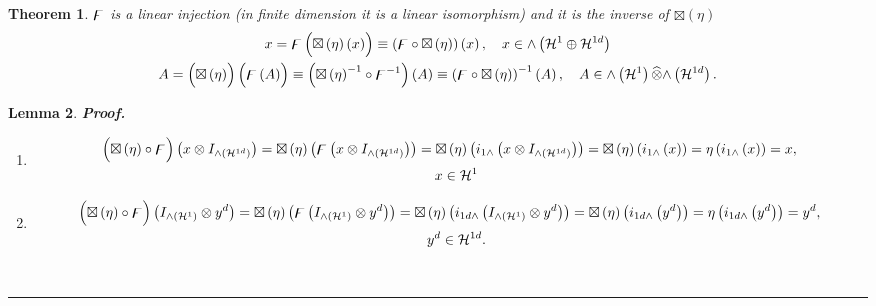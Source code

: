 \documentclass[aps,preprint]{revtex4}%
\newtheorem{theorem}{Theorem}
\newtheorem{lemma}[theorem]{Lemma}
\newenvironment{proof}[1][Proof]{\noindent\textbf{#1.} }{\ \rule{0.5em}{0.5em}}
\begin{document}
\begin{theorem}
$\bigskip\digamma$ is a linear injection (in finite dimension it is a
\emph{linear isomorphism}) and it is the inverse of $\boxtimes\left(
\eta\right)  $
\begin{gather}
x=\digamma\left(  \overset{}{\boxtimes\left(  \eta\right)  \left(  x\right)
}\right)  \equiv\left(  \digamma\circ\boxtimes\left(  \eta\right)  \right)
\left(  x\right)  ,\quad x\in{\huge \wedge}\left(  \mathcal{H}^{1}%
\oplus\mathcal{H}^{1d}\right)  \\
A=\left(  \overset{}{\boxtimes\left(  \eta\right)  }\right)  \left(
\overset{}{\digamma\left(  A\right)  }\right)  \equiv\left(  \boxtimes\left(
\eta\right)  ^{-1}\circ\digamma^{-1}\right)  \left(  A\right)  \equiv\left(
\digamma\circ\boxtimes\left(  \eta\right)  \right)  ^{-1}\left(  A\right)
,\quad A\in{\huge \wedge}\left(  \mathcal{H}^{1}\right)  \widehat{\otimes
}{\huge \wedge}\left(  \mathcal{H}^{1d}\right)  .
\end{gather}

\end{theorem}

\begin{lemma}
\begin{proof}
\begin{enumerate}
\item
\begin{gather}
\left(  \overset{}{\boxtimes\left(  \eta\right)  \circ\digamma}\right)
\left(  x\otimes I_{{\huge \wedge}\left(  \mathcal{H}^{1d}\right)  }\right)
=\boxtimes\left(  \eta\right)  \left(  \digamma\left(  x\otimes
I_{{\huge \wedge}\left(  \mathcal{H}^{1d}\right)  }\right)  \right)
=\boxtimes\left(  \eta\right)  \left(  i_{1\wedge}\left(  x\otimes
I_{{\huge \wedge}\left(  \mathcal{H}^{1d}\right)  }\right)  \right)
=\boxtimes\left(  \eta\right)  \left(  i_{1\wedge}\left(  x\right)  \right)
=\eta\left(  i_{1\wedge}\left(  x\right)  \right)  =x,\\
\quad x\in\mathcal{H}^{1}%
\end{gather}


\item
\begin{gather}
\left(  \overset{}{\boxtimes\left(  \eta\right)  \circ\digamma}\right)
\left(  I_{{\huge \wedge}\left(  \mathcal{H}^{1}\right)  }\otimes
y^{d}\right)  =\boxtimes\left(  \eta\right)  \left(  \digamma\left(
I_{{\huge \wedge}\left(  \mathcal{H}^{1}\right)  }\otimes y^{d}\right)
\right)  =\boxtimes\left(  \eta\right)  \left(  i_{1d\wedge}\left(
I_{{\huge \wedge}\left(  \mathcal{H}^{1}\right)  }\otimes y^{d}\right)
\right)  =\boxtimes\left(  \eta\right)  \left(  i_{1d\wedge}\left(
y^{d}\right)  \right)  =\eta\left(  i_{1d\wedge}\left(  y^{d}\right)  \right)
=y^{d},\\
\quad y^{d}\in\mathcal{H}^{1d}.
\end{gather}

\end{enumerate}
\end{proof}
\end{lemma}
\end{document}
